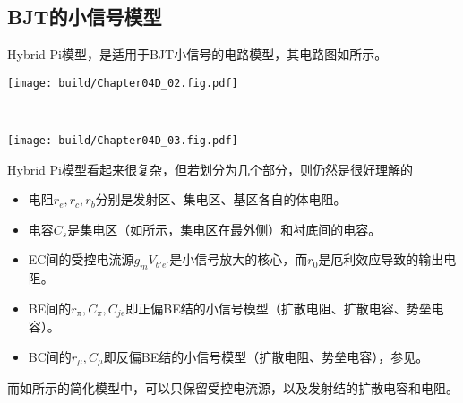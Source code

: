 \subsection{BJT的小信号模型}
Hybrid Pi模型，是适用于BJT小信号的电路模型，其电路图如所示。
\begin{Figure}
    \begin{FigureSub}[完整模型]
        \texttt{[image: build/Chapter04D\_02.fig.pdf]}   
    \end{FigureSub}\\ \vspace{0.75cm}
    \begin{FigureSub}[简化模型]
        \texttt{[image: build/Chapter04D\_03.fig.pdf]}   
    \end{FigureSub}
\end{Figure}

Hybrid Pi模型看起来很复杂，但若划分为几个部分，则仍然是很好理解的
\begin{itemize}
    \item 电阻$r_e,r_c,r_b$分别是发射区、集电区、基区各自的体电阻。
    \item 电容$C_s$是集电区（如所示，集电区在最外侧）和衬底间的电容。
    \item EC间的受控电流源$g_mV_{b'e'}$是小信号放大的核心，而$r_0$是厄利效应导致的输出电阻。
    \item BE间的$r_{\pi},C_{\pi},C_{je}$即正偏BE结的小信号模型（扩散电阻、扩散电容、势垒电容）。
    \item BC间的$r_{\mu},C_{\mu}$即反偏BE结的小信号模型（扩散电阻、势垒电容），参见。
\end{itemize}
而如所示的简化模型中，可以只保留受控电流源，以及发射结的扩散电容和电阻。